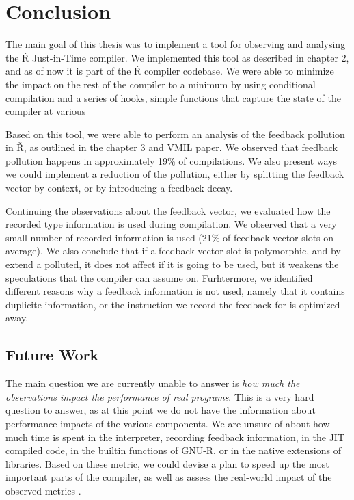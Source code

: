 \chapter*{Conclusion}

The main goal of this thesis was to implement a tool for observing and analysing the Ř Just-in-Time compiler. We implemented this tool as described in chapter 2, and as of now it is part of the Ř compiler codebase. We were able to minimize the impact on the rest of the compiler to a minimum by using conditional compilation and a series of hooks, simple functions that capture the state of the compiler at various

Based on this tool, we were able to perform an analysis of the feedback pollution in Ř, as outlined in the chapter 3 and VMIL paper\cite{feedback-vmil}. We observed that feedback pollution happens in approximately 19\% of compilations. We also present ways we could implement a reduction of the pollution, either by splitting the feedback vector by context, or by introducing a feedback decay.

Continuing the observations about the feedback vector, we evaluated how the recorded type information is used during compilation. We observed that a very small number of recorded information is used (21\% of feedback vector slots on average). We also conclude that if a feedback vector slot is polymorphic, and by extend a polluted, it does not affect if it is going to be used, but it weakens the speculations that the compiler can assume on. Furhtermore, we identified different reasons why a feedback information is not used, namely that it contains duplicite information, or the instruction we record the feedback for is optimized away.

\section*{Future Work}

The main question we are currently unable to answer is \textit{how much the observations impact the performance of real programs}. This is a very hard question to answer, as at this point we do not have the information about performance impacts of the various components. We are unsure of about how much time is spent in the interpreter, recording feedback information, in the JIT compiled code, in the builtin functions of GNU-R, or in the native extensions of libraries. Based on these metric, we could devise a plan to speed up the most important parts of the compiler, as well as assess the real-world impact of the observed metrics .

